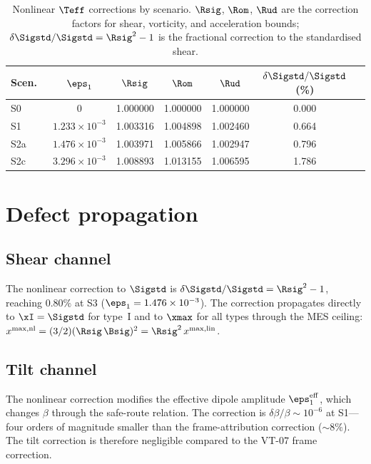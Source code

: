 \begin{table}[h]
\caption{Nonlinear $\Teff$ corrections by scenario.  $\Rsig$,
$\Rom$, $\Rud$ are the correction factors for shear, vorticity,
and acceleration bounds; $\delta\Sigstd/\Sigstd = \Rsig^2 - 1$
is the fractional correction to the standardised shear.}
\label{tab:nl-corrections}
\centering\footnotesize\setlength{\tabcolsep}{4pt}
\begin{tabular}{lcccccc}
\toprule
Scen.\ & $\eps_1$ & $\Rsig$ & $\Rom$ & $\Rud$
  & $\delta\Sigstd/\Sigstd$ (\%) \\
\midrule
S0  & $0$             & 1.000000 & 1.000000 & 1.000000 & 0.000 \\
S1  & $1.233\times10^{-3}$ & 1.003316 & 1.004898 & 1.002460 & 0.664 \\
S2a & $1.476\times10^{-3}$ & 1.003971 & 1.005866 & 1.002947 & 0.796 \\
S2c & $3.296\times10^{-3}$ & 1.008893 & 1.013155 & 1.006595 & 1.786 \\
\bottomrule
\end{tabular}
\end{table}


\section{Defect propagation}\label{sec:defect-prop}

\subsection{Shear channel}\label{sec:shear-channel}

The nonlinear correction to $\Sigstd$ is
$\delta\Sigstd/\Sigstd = \Rsig^2 - 1$, reaching $0.80\%$ at
S3 ($\eps_1 = 1.476 \times 10^{-3}$).  The correction propagates directly to $\xI = \Sigstd$ for
type~I and to $\xmax$ for all types through the MES ceiling:
$x^{\mathrm{max,nl}} = (3/2)(\Rsig\,\Bsig)^2
= \Rsig^2\,x^{\mathrm{max,lin}}$.


\subsection{Tilt channel}\label{sec:tilt-channel}

The nonlinear correction modifies the effective dipole amplitude
$\eps_1^{\mathrm{eff}}$, which changes $\beta$ through the
safe-route relation.  The correction is
$\delta\beta/\beta \sim 10^{-6}$ at S1---four orders of
magnitude smaller than the frame-attribution correction
($\sim 8\%$).  The tilt correction is therefore negligible
compared to the VT-07 frame correction.


